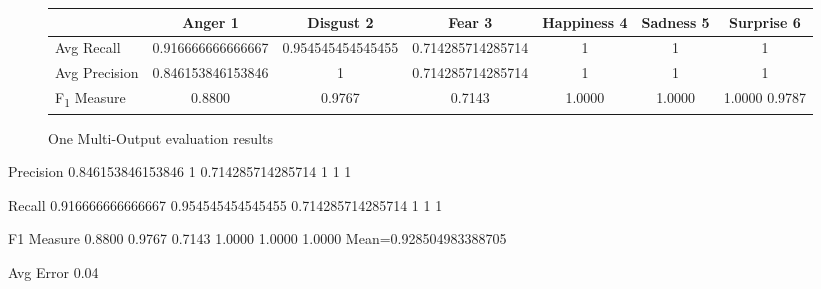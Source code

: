 \documentclass[a4paper,11pt]{article}
\begin{document}
 \begin{figure}[h]                                                               
 \begin{center}                                                                  
 \begin{tabular}{ | l || c | c | c | c | c | c | }                               
     \hline                                                                      
           							& Anger 1 & Disgust 2 & Fear 3 & Happiness 4 & Sadness 5 & Surprise 6 \\ \hline \hline
         Avg Recall 				& 0.916666666666667 & 0.954545454545455 & 0.714285714285714 & 1 & 1 & 1 \\ \hline   
         Avg Precision 				& 0.846153846153846 & 1 & 0.714285714285714 & 1 & 1 & 1 \\ \hline
         F\textsubscript{1} Measure & 0.8800 & 0.9767 & 0.7143 &  1.0000 &  1.0000 &  1.0000
         0.9787 \\ \hline                                                        
     \end{tabular}                                                               
     \caption{One Multi-Output evaluation results}                                                
     \label{fig:averageRecall}                                                   
 \end{center}                                                                    
 \end{figure} 

Precision
0.846153846153846	1	0.714285714285714	1	1	1

Recall
0.916666666666667	0.954545454545455	0.714285714285714	1	1	1

F1 Measure
0.8800    0.9767    0.7143    1.0000    1.0000    1.0000 Mean=0.928504983388705


Avg Error
0.04
\end{document}
